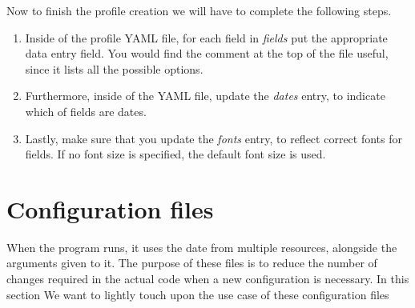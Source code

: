 \documentclass[12pt,a4paper]{article}
\begin{document}
Now to finish the profile creation we will have to complete the following steps.
\begin{enumerate}
  \item Inside of the profile YAML file, for each field in \textit{fields} put the appropriate data entry field. You would find the comment at the top
        of the file useful, since it lists all the possible options.
  \item Furthermore, inside of the YAML file, update the \textit{dates} entry, to indicate which of fields are dates.
  \item Lastly, make sure that you update the \textit{fonts} entry, to reflect correct fonts for fields. If no font size is specified,
        the default font size is used.
\end{enumerate}
\section{Configuration files}
When the program runs, it uses the date from multiple resources, alongside the arguments given to it. The purpose of these files is to reduce the number of
changes required in the actual code when a new configuration is necessary. In this section We want to lightly touch upon the use case of these configuration files
\end{document}
